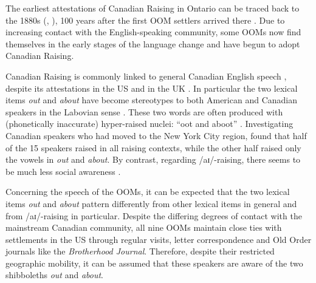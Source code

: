 \documentclass[output=paper]{langscibook}
\begin{document}
The earliest attestations of Canadian Raising in Ontario can be traced back to the 1880s (\citealt[148]{thomas_origin_1991}, \citealt[107]{chambers_canadian_2006}), 100 years after the first \gls*{OOM} settlers arrived there \citep[17]{epp_mennonites_2012}. Due to increasing contact with the English-speaking community, some \glspl*{OOM} now find themselves in the early stages of the language change and have begun to adopt Canadian Raising.

Canadian Raising is commonly linked to general Canadian English speech \citep{chambers_canadian_1989,niedzielski_effect_1999}, despite its attestations in the US \citep{labov_sociolinguistic_1972,roberts_internal_2016} and in the UK \citep{moore_natural_2018}. In particular the two lexical items \textit{out} and \textit{about} have become stereotypes to both American and Canadian speakers in the Labovian sense \citep[200]{labov_study_1971}. These two words are often produced with (phonetically inaccurate) hyper-raised nuclei: “oot and aboot” \citep[50]{nycz_changing_2013}. Investigating Canadian speakers who had moved to the New York City region, \citet[56–57]{nycz_changing_2013} found that half of the 15 speakers raised in all raising contexts, while the other half raised only the vowels in \textit{out} and \textit{about}. By contrast, regarding /aɪ/-raising, there seems to be much less social awareness \citep[76]{chambers_canadian_1989}. 

Concerning the speech of the \glspl*{OOM}, it can be expected that the two lexical items \textit{out} and \textit{about} pattern differently from other lexical items in general and from /aɪ/-raising in particular. Despite the differing degrees of contact with the mainstream Canadian community, all nine \glspl*{OOM} maintain close ties with settlements in the US through regular visits, letter correspondence and Old Order journals like the \textit{Brotherhood Journal}. Therefore, despite their restricted geographic mobility, it can be assumed that these speakers are aware of the two shibboleths \textit{out} and \textit{about}.
\end{document}
